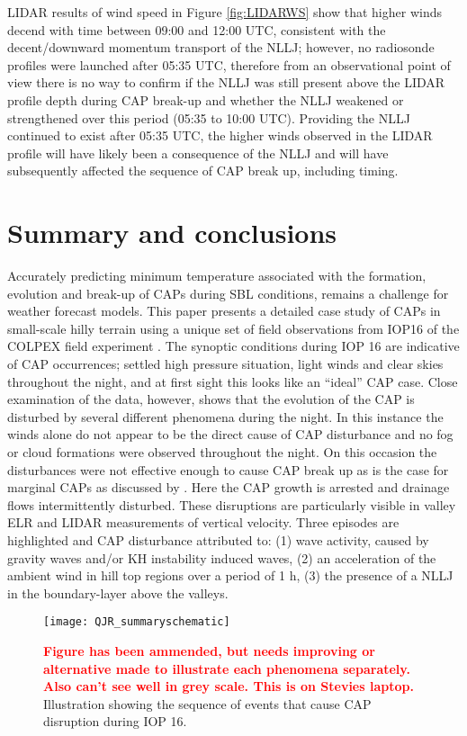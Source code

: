 \documentclass[times]{qjrms4}
\begin{document}
LIDAR results of wind speed in Figure \ref{fig:LIDARWS} show that higher winds decend with time between 09:00 and 12:00 UTC, consistent with the decent/downward momentum transport of the NLLJ; however, no radiosonde profiles were launched after 05:35 UTC, therefore from an observational point of view there is no way to confirm if the NLLJ was still present above the LIDAR profile depth during CAP break-up and whether the NLLJ weakened or strengthened over this period (05:35 to 10:00 UTC). Providing the NLLJ continued to exist after 05:35 UTC, the higher winds observed in the LIDAR profile will have likely been a consequence of the NLLJ and will have subsequently affected the sequence of CAP break up, including timing.

\section{Summary and conclusions}
\label{summary}
Accurately predicting minimum temperature associated with the formation, evolution and break-up of CAPs during SBL conditions, remains a challenge for weather forecast models. This paper presents a detailed case study of CAPs in small-scale hilly terrain using a unique set of field observations from IOP16 of the COLPEX field experiment \citep{price2010COLPEX}. The synoptic conditions during IOP 16 are indicative of CAP occurrences; settled high pressure situation, light winds and clear skies throughout the night, and at first sight this looks like an ``ideal'' CAP case. Close examination of the data, however, shows that the evolution of the CAP is disturbed by several different phenomena during the night. In this instance the winds alone do not appear to be the direct cause of CAP disturbance and no fog or cloud formations were observed throughout the night. On this occasion the disturbances were not effective enough to cause CAP break up as is the case for marginal CAPs as discussed by \citep{mahrt2015common}. Here the CAP growth is arrested and drainage flows intermittently disturbed. These disruptions are particularly visible in valley ELR and LIDAR measurements of vertical velocity. Three episodes are highlighted and CAP disturbance attributed to: (1) wave activity, caused by gravity waves and/or KH instability induced waves, (2) an acceleration of the ambient wind in hill top regions over a period of 1 h, (3) the presence of a NLLJ in the boundary-layer above the valleys.
       \begin{figure*}
        \centering
        \texttt{[image: QJR\_summaryschematic]}
        \caption{\textcolor{red}{\bf Figure has been ammended, but needs improving or alternative made to illustrate each phenomena separately. Also can't see well in grey scale. This is on Stevies laptop.} Illustration showing the sequence of events that cause CAP disruption during IOP 16.}
        \label{fig:schematic}
        \end{figure*}
\end{document}
